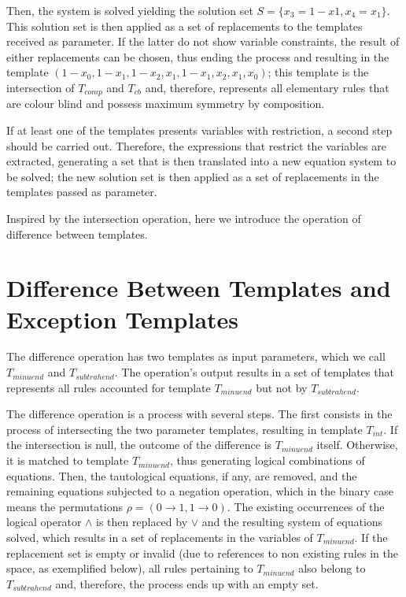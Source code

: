 \documentclass{llncs}
\begin{document}
Then, the system is solved yielding the solution set $S = \{x_3 = 1-x1, x_4 = x_1\}$. This solution set is then applied as a set of replacements to the templates received as parameter. If the latter do not show variable constraints, the result of either replacements can be chosen, thus ending the process and resulting in the template $(1 - x_0, 1 - x_1, 1 - x_2, x_1, 1 - x_1, x_2, x_1, x_0)$; this template is the intersection of $T_{comp}$ and $T_{cb}$ and, therefore, represents all elementary rules that are colour blind and possess maximum symmetry by composition.

If at least one of the templates presents variables with restriction, a second step should be carried out. Therefore, the expressions that restrict the variables are extracted, generating a set that is then translated into a new equation system to be solved; the new solution set is then applied as a set of replacements in the templates passed as parameter.

Inspired by the intersection operation, here we introduce the operation of difference between templates.

\section{Difference Between Templates and Exception Templates}
\label{sec:diferenca_entre_templates_e_templates_de_excecao}

The difference operation has two templates as input parameters, which we call $T_{minuend}$ and $T_{subtrahend}$. The operation’s output results in a set of templates that represents all rules accounted for template $T_{minuend}$ but not by $T_{subtrahend}$.

The difference operation is a process with several steps. The first consists in the process of intersecting the two parameter templates, resulting in template $T_{int}$. If the intersection is null, the outcome of the difference is $T_{minuend}$ itself. Otherwise, it is matched to template $T_{minuend}$, thus generating logical combinations of equations. Then, the tautological equations, if any, are removed, and the remaining equations subjected to a negation operation, which in the binary case means the permutations $\rho = (0 \to 1, 1 \to 0)$. The existing occurrences of the logical operator $\wedge$ is then replaced by $\vee$ and the resulting system of equations solved, which results in a set of replacements in the variables of $T_{minuend}$. If the replacement set is empty or invalid (due to references to non existing rules in the space, as exemplified below), all rules pertaining to $T_{minuend}$ also belong to $T_{subtrahend}$ and, therefore, the process ends up with an empty set.
\end{document}
